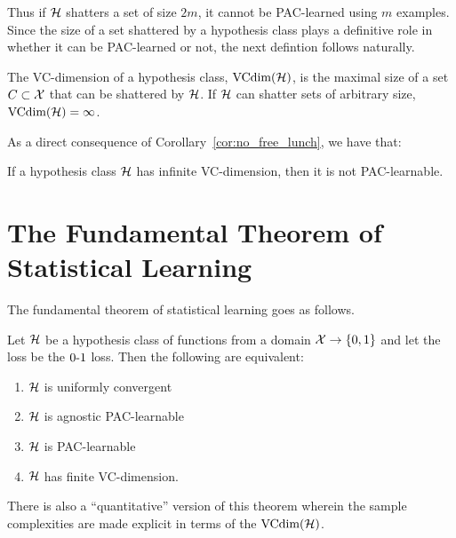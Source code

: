 Thus if $\mathcal{H}$ shatters a set of size $2m$, it cannot be PAC-learned
using $m$ examples. Since the size of a set shattered by a
hypothesis class plays a definitive role in whether it can be PAC-learned or not,
the next defintion follows naturally.
\begin{definition}
The VC-dimension of a hypothesis class, $\text{VCdim}(\mathcal{H})$, is the maximal size of
a set $C \subset \mathcal{X}$ that can be shattered by $\mathcal{H}$. If $\mathcal{H}$ can
shatter sets of arbitrary size, $\text{VCdim}(\mathcal{H}) = \infty$.
\end{definition}

As a direct consequence of Corollary~\ref{cor:no_free_lunch}, we have that:
\begin{theorem}
If a hypothesis class $\mathcal{H}$ has infinite VC-dimension, then it is not
PAC-learnable.
\end{theorem}

\section{The Fundamental Theorem of Statistical Learning}

The fundamental theorem of statistical learning goes as follows.
\begin{theorem} \label{thm:fundamental_theorem}
Let $\mathcal{H}$ be a hypothesis class of functions from a domain
$\mathcal{X} \rightarrow \{0, 1\}$ and let the loss be the $\operatorname{0-1}$ loss. Then the
following are equivalent:
\begin{enumerate}
    \item $\mathcal{H}$ is uniformly convergent
    \item $\mathcal{H}$ is agnostic PAC-learnable
    \item $\mathcal{H}$ is PAC-learnable
    \item $\mathcal{H}$ has finite VC-dimension.
\end{enumerate}
\end{theorem}

There is also a ``quantitative'' version of this theorem wherein the sample
complexities are made explicit in terms of the $\text{VCdim}(\mathcal{H})$.

